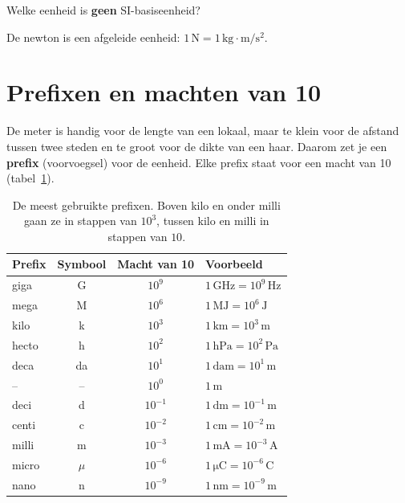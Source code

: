 \documentclass{ximera}
\begin{document}
\begin{question}
    Welke eenheid is \textbf{geen} SI-basiseenheid?

    \begin{multipleChoice}
    \end{multipleChoice}

    \begin{solution}\nl
        De newton is een afgeleide eenheid: $1 \, \mathrm{N} = 1 \, \mathrm{kg \cdot m/s^2}$.
    \end{solution}
\end{question}

\section{Prefixen en machten van 10}\label{sec:prefixen}
De meter is handig voor de lengte van een lokaal, maar te klein voor de afstand tussen twee steden en te groot voor de dikte van een haar. Daarom zet je een \textbf{prefix} (voorvoegsel) voor de eenheid. Elke prefix staat voor een macht van 10 (tabel~\ref{tab:prefixen}).

\begin{table}[h]
    \centering
    \begin{tabular}{|l|c|c|l|}
        \hline
        \textbf{Prefix} & \textbf{Symbool} & \textbf{Macht van 10} & \textbf{Voorbeeld} \\
        \hline
        giga & G & $10^{9}$ & $1 \, \mathrm{GHz} = 10^{9} \, \mathrm{Hz}$ \\
        mega & M & $10^{6}$ & $1 \, \mathrm{MJ} = 10^{6} \, \mathrm{J}$ \\
        kilo & k & $10^{3}$ & $1 \, \mathrm{km} = 10^{3} \, \mathrm{m}$ \\
        hecto & h & $10^{2}$ & $1 \, \mathrm{hPa} = 10^{2} \, \mathrm{Pa}$ \\
        deca & da & $10^{1}$ & $1 \, \mathrm{dam} = 10^{1} \, \mathrm{m}$ \\
        -- & -- & $10^{0}$ & $1 \, \mathrm{m}$ \\
        deci & d & $10^{-1}$ & $1 \, \mathrm{dm} = 10^{-1} \, \mathrm{m}$ \\
        centi & c & $10^{-2}$ & $1 \, \mathrm{cm} = 10^{-2} \, \mathrm{m}$ \\
        milli & m & $10^{-3}$ & $1 \, \mathrm{mA} = 10^{-3} \, \mathrm{A}$ \\
        micro & $\mu$ & $10^{-6}$ & $1 \, \mathrm{\mu C} = 10^{-6} \, \mathrm{C}$ \\
        nano & n & $10^{-9}$ & $1 \, \mathrm{nm} = 10^{-9} \, \mathrm{m}$ \\
        \hline
    \end{tabular}
    \caption{De meest gebruikte prefixen. Boven kilo en onder milli gaan ze in stappen van $10^{3}$, tussen kilo en milli in stappen van $10$.}
    \label{tab:prefixen}
\end{table}
\end{document}
